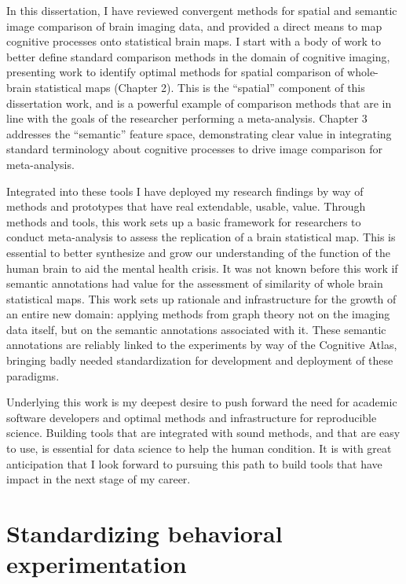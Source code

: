 \documentclass{report}
\begin{document}
In this dissertation, I have reviewed convergent methods for spatial and semantic image comparison of brain imaging data, and provided a direct means to map cognitive processes onto statistical brain maps. I start with a body of work to better define standard comparison
methods in the domain of cognitive imaging, presenting work to identify
optimal methods for spatial comparison of whole-brain statistical maps
(Chapter 2). This is the ``spatial'' component of this dissertation
work, and is a powerful example of comparison methods that are in line
with the goals of the researcher performing a meta-analysis. Chapter 3
addresses the ``semantic'' feature space, demonstrating clear value in integrating
standard terminology about cognitive processes to drive image comparison
for meta-analysis.

Integrated into these tools I have deployed my research findings by way
of methods and prototypes that have real extendable, usable, value.
Through methods and tools, this work sets up a basic framework for
researchers to conduct meta-analysis to assess the replication of a brain statistical
map. This is essential to better synthesize and grow our understanding of the function of the human brain to aid the mental health crisis. It was not known before this work if semantic annotations had value for the assessment of similarity of whole brain statistical maps. This work sets up rationale
and infrastructure for the growth of an entire new domain: applying
methods from graph theory not on the imaging data itself, but on the
semantic annotations associated with it. These semantic annotations are
reliably linked to the experiments by way of the Cognitive Atlas,
bringing badly needed standardization for development and deployment of
these paradigms.

Underlying this work is my deepest desire to push forward the need for
academic software developers and optimal methods and infrastructure for reproducible
science. Building tools that are integrated with sound methods, and that are easy to use, is essential for data science to help the human condition. It is with great anticipation that I look forward to pursuing this path to build tools that have impact in the next stage of my career. 

\appendix

\chapter{Standardizing behavioral experimentation}
\end{document}
